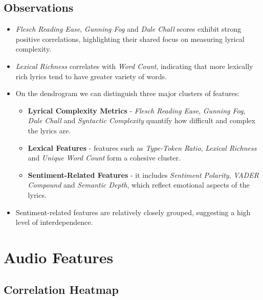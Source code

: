\subsection*{Observations}

\begin{itemize}
  \item \textit{Flesch Reading Ease}, \textit{Gunning Fog} and \textit{Dale
    Chall} scores exhibit strong positive correlations, highlighting their
    shared focus on measuring lyrical complexity.
  \item \textit{Lexical Richness} correlates with \textit{Word Count},
    indicating that more lexically rich lyrics tend to have  greater variety
    of words.
  \item On the dendrogram we can distinguish three major clusters of features:
    \begin{itemize}
      \item \textbf{Lyrical Complexity Metrics} - \textit{Flesch Reading Ease},
        \textit{Gunning Fog}, \textit{Dale Chall} and \textit{Syntactic
        Complexity } quantify how difficult and complex the lyrics are.
      \item  \textbf{Lexical Features} - features such as \textit{Type-Token
        Ratio}, \textit{Lexical Richness} and \textit{Unique Word Count} form a
        cohesive cluster.
      \item \textbf{Sentiment-Related Features} - it includes \textit{Sentiment
        Polarity}, \textit{VADER Compound} and \textit{Semantic Depth}, which
        reflect emotional aspects of the lyrics.
    \end{itemize}
  \item Sentiment-related features are relatively closely grouped, suggesting a
    high level of interdependence.
\end{itemize}


\section{Audio Features}

\subsection*{Correlation Heatmap}
\label{sec:correlationheatmapsspotifyfeatures}

